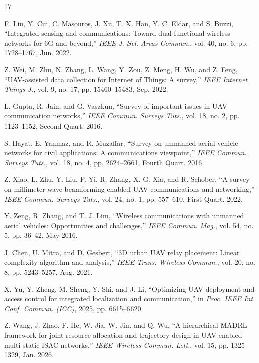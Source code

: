 \documentclass[lettersize,journal]{IEEEtran}
\begin{document}
\begin{thebibliography}{17}
\footnotesize
\setlength{\itemsep}{0pt}
\setlength{\parskip}{0pt}
\setlength{\parsep}{0pt}

F. Liu, Y. Cui, C. Masouros, J. Xu, T. X. Han, Y. C. Eldar, and S. Buzzi, ``Integrated sensing and communications: Toward dual-functional wireless networks for 6G and beyond,'' \emph{IEEE J. Sel. Areas Commun.}, vol. 40, no. 6, pp. 1728--1767, Jun. 2022.

Z. Wei, M. Zhu, N. Zhang, L. Wang, Y. Zou, Z. Meng, H. Wu, and Z. Feng, ``UAV-assisted data collection for Internet of Things: A survey,'' \emph{IEEE Internet Things J.}, vol. 9, no. 17, pp. 15460--15483, Sep. 2022.

L. Gupta, R. Jain, and G. Vaszkun, ``Survey of important issues in UAV communication networks,'' \emph{IEEE Commun. Surveys Tuts.}, vol. 18, no. 2, pp. 1123--1152, Second Quart. 2016.

S. Hayat, E. Yanmaz, and R. Muzaffar, ``Survey on unmanned aerial vehicle networks for civil applications: A communications viewpoint,'' \emph{IEEE Commun. Surveys Tuts.}, vol. 18, no. 4, pp. 2624--2661, Fourth Quart. 2016.

Z. Xiao, L. Zhu, Y. Liu, P. Yi, R. Zhang, X.-G. Xia, and R. Schober, ``A survey on millimeter-wave beamforming enabled UAV communications and networking,'' \emph{IEEE Commun. Surveys Tuts.}, vol. 24, no. 1, pp. 557--610, First Quart. 2022.

Y. Zeng, R. Zhang, and T. J. Lim, ``Wireless communications with unmanned aerial vehicles: Opportunities and challenges,'' \emph{IEEE Commun. Mag.}, vol. 54, no. 5, pp. 36--42, May 2016.

J. Chen, U. Mitra, and D. Gesbert, ``3D urban UAV relay placement: Linear complexity algorithm and analysis,'' \emph{IEEE Trans. Wireless Commun.}, vol. 20, no. 8, pp. 5243--5257, Aug. 2021.

X. Yu, Y. Zheng, M. Sheng, Y. Shi, and J. Li, ``Optimizing UAV deployment and access control for integrated localization and communication,'' in \emph{Proc. IEEE Int. Conf. Commun. (ICC)}, 2025, pp. 6615--6620.

Z. Wang, J. Zhao, F. He, W. Jia, W. Jin, and Q. Wu, ``A hierarchical MADRL framework for joint resource allocation and trajectory design in UAV enabled multi-static ISAC networks,'' \emph{IEEE Wireless Commun. Lett.}, vol. 15, pp. 1325--1329, Jan. 2026.


\end{thebibliography}
\end{document}
